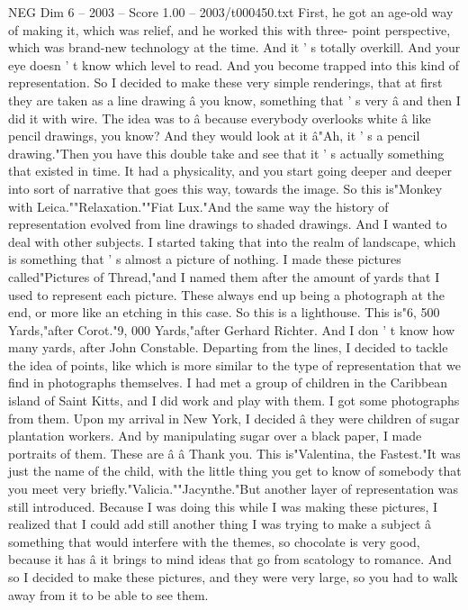 \begin{textsample}{NEG Dim 6 – 2003 – Score 1.00 – 2003/t000450.txt}
First, he got an age-old way of making it, which was relief, and he worked this with three- point perspective, which was brand-new technology at the time.
And it ' s totally overkill.
And your eye doesn ' t know which level to read.
And you become trapped into this kind of representation.
So I decided to make these very simple renderings, that at first they are taken as a line drawing â you know, something that ' s very â and then I did it with wire.
The idea was to â because everybody overlooks white â like pencil drawings, you know?
And they would look at it â"Ah, it ' s a pencil drawing."Then you have this double take and see that it ' s actually something that existed in time.
It had a physicality, and you start going deeper and deeper into sort of narrative that goes this way, towards the image.
So this is"Monkey with Leica.""Relaxation.""Fiat Lux."And the same way the history of representation evolved from line drawings to shaded drawings.
And I wanted to deal with other subjects.
I started taking that into the realm of landscape, which is something that ' s almost a picture of nothing.
I made these pictures called"Pictures of Thread,"and I named them after the amount of yards that I used to represent each picture.
These always end up being a photograph at the end, or more like an etching in this case.
So this is a lighthouse.
This is"6, 500 Yards,"after Corot."9, 000 Yards,"after Gerhard Richter.
And I don ' t know how many yards, after John Constable.
Departing from the lines, I decided to tackle the idea of points, like which is more similar to the type of representation that we find in photographs themselves.
I had met a group of children in the Caribbean island of Saint Kitts, and I did work and play with them.
I got some photographs from them.
Upon my arrival in New York, I decided â they were children of sugar plantation workers.
And by manipulating sugar over a black paper, I made portraits of them.
These are â â Thank you.
This is"Valentina, the Fastest."It was just the name of the child, with the little thing you get to know of somebody that you meet very briefly."Valicia.""Jacynthe."But another layer of representation was still introduced.
Because I was doing this while I was making these pictures, I realized that I could add still another thing I was trying to make a subject â something that would interfere with the themes, so chocolate is very good, because it has â it brings to mind ideas that go from scatology to romance.
And so I decided to make these pictures, and they were very large, so you had to walk away from it to be able to see them.

\end{textsample}
